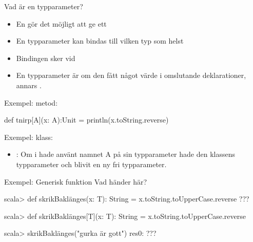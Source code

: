 

\begin{Slide}{Vad är en typparameter?}\SlideFontSmall
\begin{itemize}
\item En  gör det möjligt att ge ett 
\item En  typparameter kan bindas till vilken typ som helst 
\item Bindingen sker vid 
\item En typparameter är  om den  fått något värde i omslutande deklarationer, annars .
\end{itemize}
Exempel:  metod:
\begin{Code}
def tnirp[A](x: A):Unit = println(x.toString.reverse)
\end{Code}
\pause
Exempel:  klass:
\pause
\begin{itemize}
\item {}: Om  i  hade använt namnet A på sin typparameter hade den  klassens typparameter och blivit en ny fri typparameter.
\end{itemize}

\end{Slide}

\ifkompendium\else
\begin{Slide}{Exempel: Generisk funktion}
Vad händer här?
\begin{REPL}

scala> def skrikBaklänges(x: T): String = x.toString.toUpperCase.reverse
???



scala> def skrikBaklänges[T](x: T): String = x.toString.toUpperCase.reverse

scala> skrikBaklänges("gurka är gott")
res0: ???

\end{REPL}
\end{Slide}


